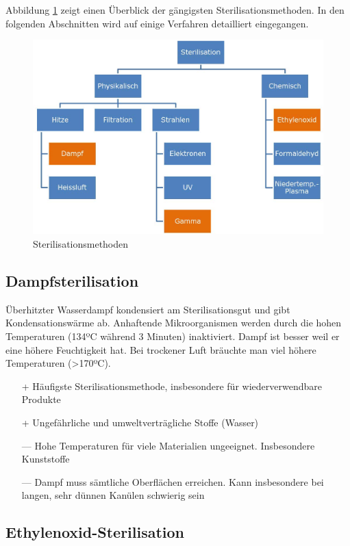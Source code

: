 Abbildung \ref{fig:sterilisationsmethoden} zeigt einen Überblick der gängigsten Sterilisationsmethoden. In den folgenden Abschnitten wird auf einige Verfahren detailliert eingegangen.

\begin{figure}
\centering
\includegraphics[width=0.7\linewidth]{fig/sterilisationsmethoden}
\caption{Sterilisationsmethoden}
\label{fig:sterilisationsmethoden}
\end{figure}

\subsection{Dampfsterilisation}

Überhitzter Wasserdampf kondensiert am Sterilisationsgut und gibt Kondensationswärme ab. Anhaftende Mikroorganismen werden durch die hohen Temperaturen (134ºC während 3 Minuten) inaktiviert. Dampf ist besser weil er eine höhere Feuchtigkeit hat. Bei trockener Luft bräuchte man viel höhere Temperaturen (>170ºC).

\begin{itemize}
	\item[+] Häufigste Sterilisationsmethode, insbesondere für wiederverwendbare Produkte
	\item[+] Ungefährliche und umweltverträgliche Stoffe (Wasser)
	\item[---] Hohe Temperaturen für viele Materialien ungeeignet. Insbesondere Kunststoffe
	\item[---] Dampf muss sämtliche Oberflächen erreichen. Kann insbesondere bei langen, sehr dünnen Kanülen schwierig sein
\end{itemize}

\subsection{Ethylenoxid-Sterilisation}

